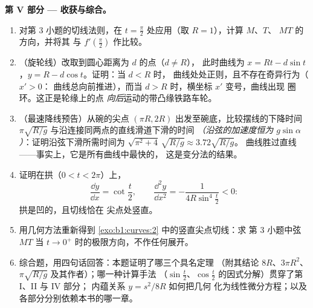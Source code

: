 \begin{problem}
\medskip
\noindent\textbf{第 V 部分 --- 收获与综合。}
\begin{enumerate}[resume]
  \item 对第 3 小题的切线法则，在 $t =
        \frac\pi2$ 处应用（取 $R = 1$），计算 $M$、$T$、
        $MT$ 的方向，并将其
        与 $f'(\frac\pi2)$ 作比较。
  \item （旋轮线）改取到圆心距离为 $d$ 的点（$d \neq R$），
        此时曲线为 $x = Rt -
        d\sin t$，$y = R - d\cos t$。证明：当 $d < R$ 时，
        曲线处处正则，且不存在奇异行为（$x' > 0$：
        曲线总向前推进），而当 $d
        > R$ 时，横坐标 $x'$ 变号，曲线出现
        圈环。这正是轮缘上的点
        \emph{向后}运动的带凸缘铁路车轮。
  \item （最速降线预告）从碗的尖点 $(\pi R, 2R)$
        出发至碗底，比较摆线的下降时间
        $\pi\sqrt{R/g}$ 与沿连接同两点的直线滑道下滑的时间
        \emph{（沿弦的加速度恒为
        $g\sin\alpha$）}：证明沿弦下滑所需时间为
        $\sqrt{\pi^2 + 4}\,\sqrt{R/g} \approx 3.72\sqrt{R/g}$。
        曲线胜过直线——事实上，它是所有曲线中最快的，
        这是变分法的结果。
  \item 证明在拱（$0 < t < 2\pi$）上，
        \[
        \frac{\dd y}{\dd x} = \cot\frac t2,
        \qquad
        \frac{\dd^2 y}{\dd x^2} =
        -\frac{1}{4R\sin^4\frac t2} < 0 :
        \]
        拱是凹的，且切线恰在
        尖点处竖直。
  \item 用几何方法重新得到
        \cref{exo:b1:curves:2} 中的竖直尖点切线：求
        第 3 小题中弦 $MT$ 当 $t \to
        0^{+}$ 时的极限方向，不作任何展开。
  \item 综合题，用四句话回答：本题证明了哪三个具名定理
        （附其结论 $8R$、$3\pi
        R^2$、$\pi\sqrt{R/g}$ 及其作者）；哪一种计算手法
        （$\sin\frac t2$、$\cos\frac t2$
        的因式分解）贯穿了第 I、II 与 IV 部分；
        内蕴关系 $y = s^2/8R$ 如何把几何
        化为线性微分方程；以及
        各部分分别依赖本书的哪一章。
\end{enumerate}
\end{problem}
